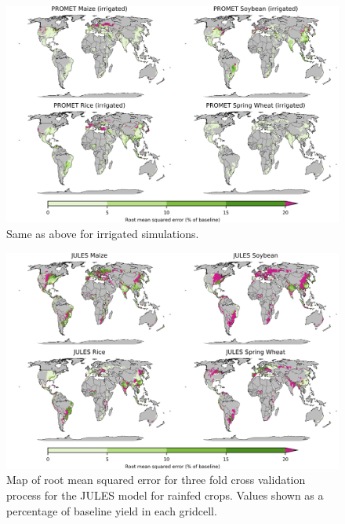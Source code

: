 \documentclass[10pt]{article}
\begin{document}
\begin{figure}[h!]
\centering
\includegraphics[width=15.5cm]{PROMET_spatial_MSE_ton_ha_irr.png}
\caption{Same as above for irrigated simulations.}
\label{fig:pdssatrmseirr}
\end{figure}

\begin{figure}[h!]
\centering
\includegraphics[width=15.5cm]{JULES_spatial_MSE_ton_ha.png}
\caption{Map of root mean squared error for three fold cross validation process for the JULES model for rainfed crops. Values shown as a percentage of baseline yield in each gridcell.}
\label{fig:pdssatrmse}
\end{figure}
\end{document}
